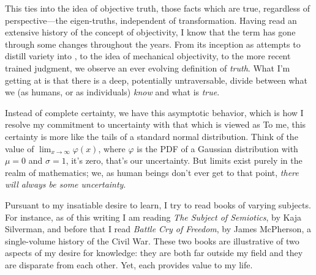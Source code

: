 \documentclass[../butidigress.tex]{subfiles}
\begin{document}
This ties into the idea of objective truth, those facts which are true, regardless of perspective---the eigen-truths, independent of transformation.
Having read an extensive history of the concept of objectivity, I know that the term has gone through some changes throughout the years\parencite{objectivity}.
From its inception as attempts to distill variety into , to the idea of mechanical objectivity, to the more recent trained judgment, we observe an ever evolving definition of \emph{truth}.
What I'm getting at is that there is a deep, potentially untraversable, divide between what we (as humans, or as individuals) \emph{know} and what is \emph{true}.

Instead of complete certainty, we have this asymptotic behavior, which is how I resolve my commitment to uncertainty with that which is viewed as 
To me, this certainty is more like the tails of a standard normal distribution.
Think of the value of $\lim_{x\to\infty}\varphi(x)$, where $\varphi$ is the PDF of a Gaussian distribution with $\mu = 0$ and $\sigma = 1$, it's zero, that's our uncertainty.
But limits exist purely in the realm of mathematics; we, as human beings don't ever get to that point, \emph{there will always be some uncertainty}.


Pursuant to my insatiable desire to learn, I try to read books of varying subjects.
For instance, as of this writing I am reading \textit{The Subject of Semiotics}, by Kaja Silverman, and before that I read \textit{Battle Cry of Freedom}, by James McPherson, a single-volume history of the Civil War.
These two books are illustrative of two aspects of my desire for knowledge: they are both far outside my field and they are disparate from each other.
Yet, each provides value to my life.
\end{document}
